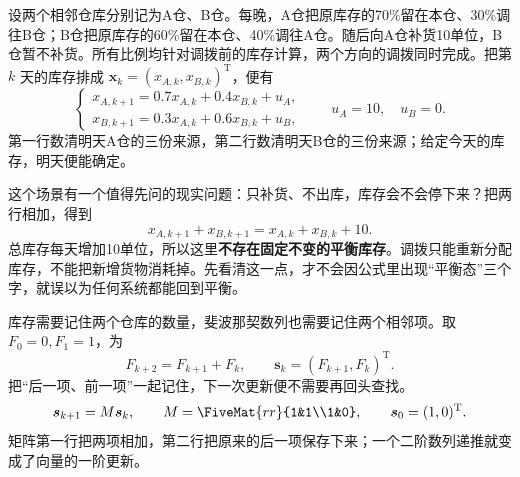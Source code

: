 \documentclass[a4paper,12pt,twoside,openany,fontset=none]{ctexbook}
\numberwithin{equation}{chapter}
\begin{document}
设两个相邻仓库分别记为A仓、B仓。每晚，A仓把原库存的70\%留在本仓、30\%调往B仓；B仓把原库存的60\%留在本仓、40\%调往A仓。随后向A仓补货10单位，B仓暂不补货。所有比例均针对调拨前的库存计算，两个方向的调拨同时完成。把第 $k$ 天的库存排成 $\boldsymbol x_k=(x_{A,k},x_{B,k})^{\mathrm T}$，便有
\begin{equation}
 \begin{cases}
 x_{A,k+1}=0.7x_{A,k}+0.4x_{B,k}+u_A,\\
 x_{B,k+1}=0.3x_{A,k}+0.6x_{B,k}+u_B,
 \end{cases}
 \qquad u_A=10,\quad u_B=0.
 \label{eq:five-warehouse-update}
\end{equation}
第一行数清明天A仓的三份来源，第二行数清明天B仓的三份来源；给定今天的库存，明天便能确定。


这个场景有一个值得先问的现实问题：只补货、不出库，库存会不会停下来？把两行相加，得到
\begin{equation}
 x_{A,k+1}+x_{B,k+1}=x_{A,k}+x_{B,k}+10.
\end{equation}
总库存每天增加10单位，所以这里\textbf{不存在固定不变的平衡库存}。调拨只能重新分配库存，不能把新增货物消耗掉。先看清这一点，才不会因公式里出现“平衡态”三个字，就误以为任何系统都能回到平衡。

库存需要记住两个仓库的数量，斐波那契数列也需要记住两个相邻项。取 $F_0=0,F_1=1$，为
\begin{equation}
 F_{k+2}=F_{k+1}+F_k,\qquad
 \boldsymbol s_k=(F_{k+1},F_k)^{\mathrm T}.
\end{equation}
把“后一项、前一项”一起记住，下一次更新便不需要再回头查找。
\begin{equation}
 \boldsymbol s_{k+1}=M\boldsymbol s_k,\qquad
 M=\FiveMat{rr}{1&1\\1&0},\qquad \boldsymbol s_0=(1,0)^{\mathrm T}.
 \label{eq:five-fibonacci-state}
\end{equation}
矩阵第一行把两项相加，第二行把原来的后一项保存下来；一个二阶数列递推就变成了向量的一阶更新。
\end{document}
